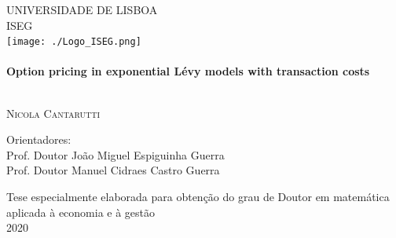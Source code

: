 \begin{titlepage}
\begin{center}



\textsc{\Large UNIVERSIDADE DE LISBOA}\\[0.5cm]
\textsc{\Large ISEG}\\[1cm]

\texttt{[image: ./Logo\_ISEG.png]}~\\[1cm]

\HRule \\[0.4cm]
{ \huge \bfseries Option pricing in exponential Lévy models with transaction costs \\[0.4cm] }

\HRule \\[1.5cm]


\textsc{\LARGE Nicola Cantarutti}\\[1.5cm]


\noindent
\begin{flushleft} \large
Orientadores:\\[0.2cm]
Prof. Doutor João Miguel Espiguinha Guerra\\
Prof. Doutor Manuel Cidraes Castro Guerra\\
\end{flushleft}


\vfill

{Tese especialmente elaborada para obtenção do grau de Doutor em matemática aplicada à economia e à gestão}\\[2cm]

{\large 2020}\\[0.3cm]

\end{center}
\end{titlepage}